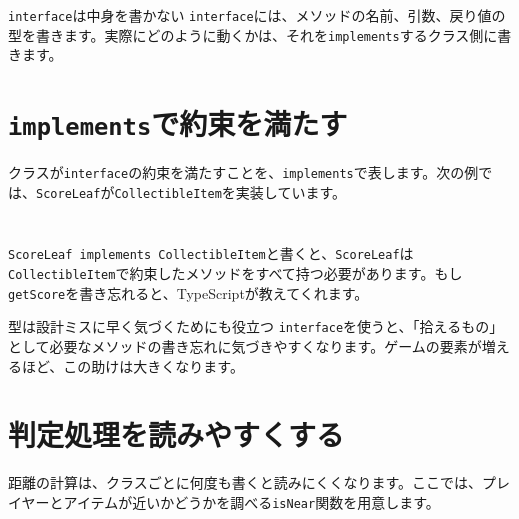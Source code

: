 \begin{pointbox}{\texttt{interface}は中身を書かない}
\texttt{interface}には、メソッドの名前、引数、戻り値の型を書きます。実際にどのように動くかは、それを\texttt{implements}するクラス側に書きます。
\end{pointbox}

\section{\texttt{implements}で約束を満たす}

クラスが\texttt{interface}の約束を満たすことを、\texttt{implements}で表します。次の例では、\texttt{ScoreLeaf}が\texttt{CollectibleItem}を実装しています。

\begin{listing}[htbp]
\inputminted[firstline=10,lastline=35]{ts}{typescript-p5/listings/chapter19/collectible-interface.ts}
\caption{プレイヤーを表す\texttt{Player}クラス（\texttt{chapter19/collectible-interface.ts}）}
\label{lst:chapter19-player-class}
\end{listing}

\begin{listing}[htbp]
\inputminted[firstline=37,lastline=80]{ts}{typescript-p5/listings/chapter19/collectible-interface.ts}
\caption{\texttt{CollectibleItem}を実装する落ち葉（\texttt{chapter19/collectible-interface.ts}）}
\label{lst:chapter19-score-leaf}
\end{listing}

\texttt{ScoreLeaf implements CollectibleItem}と書くと、\texttt{ScoreLeaf}は\texttt{CollectibleItem}で約束したメソッドをすべて持つ必要があります。もし\texttt{getScore}を書き忘れると、TypeScriptが教えてくれます。

\begin{notebox}{型は設計ミスに早く気づくためにも役立つ}
\texttt{interface}を使うと、「拾えるもの」として必要なメソッドの書き忘れに気づきやすくなります。ゲームの要素が増えるほど、この助けは大きくなります。
\end{notebox}

\section{判定処理を読みやすくする}

距離の計算は、クラスごとに何度も書くと読みにくくなります。ここでは、プレイヤーとアイテムが近いかどうかを調べる\texttt{isNear}関数を用意します。

\begin{listing}[htbp]
\inputminted[firstline=1,lastline=23]{ts}{typescript-p5/listings/chapter19/interface-without-vector.ts}
\caption{距離判定を関数に分ける（\texttt{chapter19/interface-without-vector.ts}）}
\label{lst:chapter19-interface-helper}
\end{listing}

